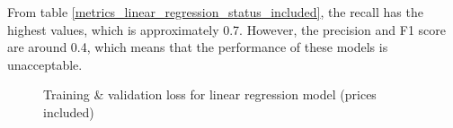\documentclass[12pt,twoside]{report}
\begin{document}
From table \ref{metrics_linear_regression_status_included}, the recall has the highest values, which is approximately 0.7. However, the precision and F1 score are around 0.4, which means that the performance of these models is unacceptable. 
\begin{figure}[!htbp]
	\centering
	\hfill
	\hfill
	\hfil
	\hfil
	\caption{Training \& validation loss for linear regression model (prices included)}
	\label{linear_regression_status_include_full}
\end{figure}
\end{document}
